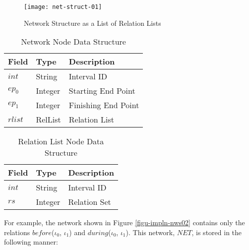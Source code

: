 \documentclass[11pt]{report}
\begin{document}
          \begin{figure}[tbhp]
            \begin{center}
              \texttt{[image: net-struct-01]}
              \caption{Network Structure as a List of Relation Lists}
              \label{figu-impln-nws01}
            \end{center}
          \end{figure}

          \begin{table}[tbhp]
            \begin{center}
              \begin{tabular}[t]{|l|l|l|}
                \hline
                {\bf Field} & {\bf Type} & {\bf Description} \\
                \hline
                $int$       & String     & Interval ID \\
                \hline
                $ep_0$      & Integer    & Starting End Point \\
                \hline
                $ep_1$      & Integer    & Finishing End Point \\
                \hline
                $rlist$     & RelList    & Relation List \\
                \hline
              \end{tabular}
            \end{center}
            \caption{Network Node Data Structure}
            \label{tabl-impln-nwdsr}
          \end{table}

          \begin{table}[tbhp]
            \begin{center}
              \begin{tabular}[t]{|l|l|l|}
                \hline
                {\bf Field} & {\bf Type} & {\bf Description} \\
                \hline
                $int$ & String & Interval ID \\
                \hline
                $rs$      & Integer & Relation Set \\
                \hline
              \end{tabular}
            \end{center}
            \caption{Relation List Node Data Structure}
            \label{tabl-impln-rldsr}
          \end{table}

          For example, the network shown in Figure \ref{figu-impln-nws02}
          contains only the relations $before$($\iota_0$, $\iota_1$) and
          $during$($\iota_0$, $\iota_1$). This network, $NET$, is stored in the
          following manner:
\end{document}

